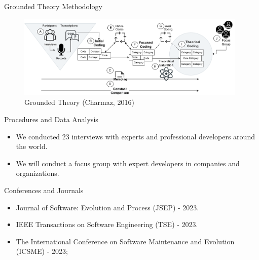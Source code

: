 \documentclass[newPxFont,numfooter,sectionpages]{beamer}
\begin{document}

\begin{frame}[c]{Grounded Theory Methodology}

\begin{figure}[H]
\includegraphics[width=11cm]{images/gt-overview.drawio.pdf}
\caption{Grounded Theory (Charmaz, 2016)}
\end{figure}

\end{frame}

\begin{frame}[c]{Procedures and Data Analysis}

\begin{itemize}

\item We conducted 23 interviews with experts and professional developers around the world.
\item We will conduct a focus group with expert developers in companies and organizations.

\end{itemize}

\end{frame}

\begin{frame}[c]{Conferences and Journals}

\begin{itemize}
    \item Journal of Software: Evolution and Process (JSEP) - 2023.
    \item IEEE Transactions on Software Engineering (TSE) - 2023.
    \item The International Conference on Software Maintenance and Evolution (ICSME) - 2023;
\end{itemize}

\end{frame}


\end{document}
